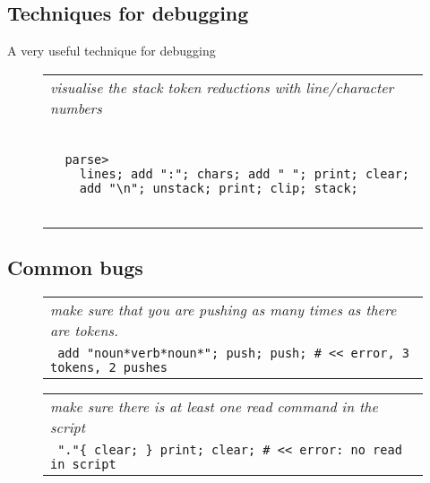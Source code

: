 \documentclass[a4paper,12pt]{article}
\begin{document}
\subsection{Techniques for debugging}


  A very useful technique for debugging
 \begin{figure}
 \begin{tabular}{ l }
 \emph{ visualise the stack token reductions with line/character numbers  } \\ 
 \begin{lstlisting}[breaklines] 

  parse>
    lines; add ":"; chars; add " "; print; clear; 
    add "\n"; unstack; print; clip; stack; 
  
 \end{lstlisting} 
 \end{tabular} 

 \end{figure}

\subsection{Common bugs}
 \begin{figure}
 \begin{tabular}{ l }
 \emph{ make sure that you are pushing as many times as there are tokens. } \\ 
 \verb| add "noun*verb*noun*"; push; push; # << error, 3 tokens, 2 pushes |
 \end{tabular} 
 \end{figure}
 \begin{figure}
 \begin{tabular}{ l }
 \emph{ make sure there is at least one read command in the script  } \\ 
 \verb| "."{ clear; } print; clear; # << error: no read in script |
 \end{tabular} 
 \end{figure}
\end{document}
